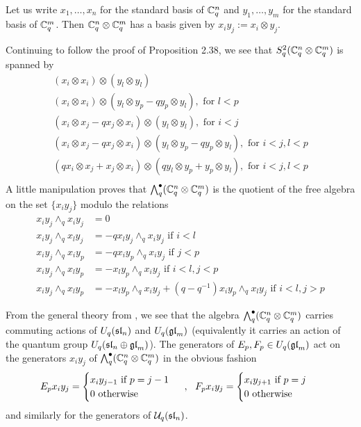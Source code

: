 \documentclass[10pt,leqno]{article}
\begin{document}
Let us write $ x_1, \dots, x_n $ for the standard basis of $ \bC_q^n $ and $ y_1, \dots, y_m $ for the standard basis of $ \bC_q^m $.  Then $ \bC_q^n \otimes \bC_q^m $ has a basis given by $ x_i y_j := x_i \otimes y_j $.

Continuing to follow the proof of Proposition 2.38, we see that $ S^2_q (\bC_q^n \otimes \bC_q^m) $ is spanned by
\begin{gather*}
(x_i \otimes x_i) \otimes (y_l \otimes y_l) \\
(x_i \otimes x_i) \otimes (y_l \otimes y_p - q y_p \otimes y_l), \text{ for } l < p \\
(x_i \otimes x_j - q x_j \otimes x_i) \otimes (y_l \otimes y_l), \text{ for } i < j \\
(x_i \otimes x_j - q x_j \otimes x_i) \otimes (y_l \otimes y_p - q y_p \otimes y_l), \text{ for } i < j, l < p \\
(q x_i \otimes x_j +  x_j \otimes x_i) \otimes (q y_l \otimes y_p +  y_p \otimes y_l), \text{ for } i < j, l < p \\
\end{gather*}
A little manipulation proves that $ \Alt^\bullet_q(\bC_q^n \otimes \bC_q^m) $ is the quotient of the free algebra on the set $ \{ x_i y_j \} $ modulo the relations
\begin{align*}
x_iy_j \wedge_q x_i y_j &= 0 \\
x_iy_j \wedge_q x_l y_j &= - q x_l y_j \wedge_q x_i y_j  \text{ if } i < l \\
x_i y_j \wedge_q x_i y_p &= - q x_i y_p \wedge_q x_i y_j \text{ if } j < p \\
x_i y_j \wedge_q x_l y_p &= -x_l y_p \wedge_q x_i y_j \text{ if  } i < l, j < p \\
x_i y_j \wedge_q x_l y_p &= -x_l y_p \wedge_q x_i y_j + (q - q^{-1}) x_i y_p \wedge_q x_l y_j \text{ if } i < l, j > p 
\end{align*}

From the general theory from \cite{BW}, we see that the algebra $ \Alt^\bullet_q(\bC_q^n \otimes \bC_q^m) $ carries commuting actions of $ U_q(\sl_n) $ and $ U_q(\gl_m) $ (equivalently it carries an action of the quantum group $ U_q(\sl_n \oplus \gl_m) $).  The generators of $E_p, F_p 
\in U_q(\gl_m) $ act on the generators $ x_i y_j $ of $\Alt^\bullet_q(\bC_q^n \otimes \bC_q^m) $ in the obvious fashion
$$
E_p x_i y_j = \begin{cases} x_i y_{j-1} \text{ if $ p = j-1 $ } \\
 0 \text{  otherwise}
 \end{cases}, \ \ F_p x_i y_j = \begin{cases} x_i y_{j+1} \text{ if $ p = j $ } \\
 0 \text{ otherwise}
 \end{cases}
$$
and similarly for the generators of $ \Uq(\sl_n) $.
\end{document}
